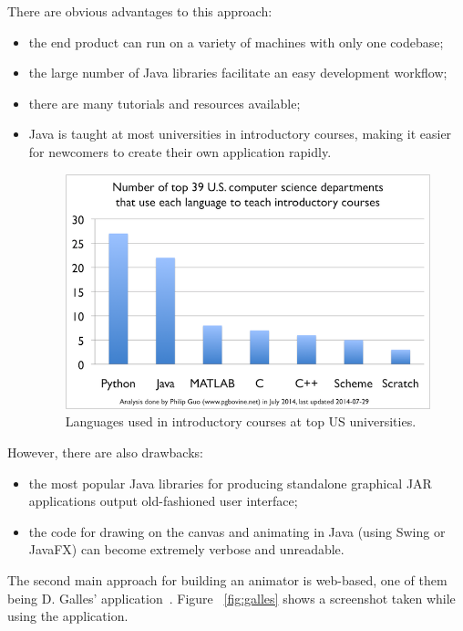 \documentclass{l4proj}
\begin{document}
There are obvious advantages to this approach:
\begin{itemize}
	\item the end product can run on a variety of machines with only one codebase;
	\item the large number of Java libraries facilitate an easy development workflow;
    \item there are many tutorials and resources available;
    \item Java is taught at most universities in introductory courses, making it easier for newcomers to create their
      own application rapidly.
    	\begin{figure}[!ht]
		\centering
		\includegraphics[scale=0.8]{java-uni}
		\caption{Languages used in introductory courses at top US universities.}
		\label{fig:java-uni}
		\end{figure}
\end{itemize}

\pagebreak

However, there are also drawbacks:
\begin{itemize}
\item the most popular Java libraries for producing standalone graphical JAR applications output old-fashioned user
  interface;
\item the code for drawing on the canvas and animating in Java (using Swing or JavaFX) can become extremely verbose
  and unreadable.
\end{itemize}

The second main approach for building an animator is web-based, one of them being D. Galles'
application~\cite{galles}. Figure ~\ref{fig:galles} shows a screenshot taken while using the application.
\end{document}
